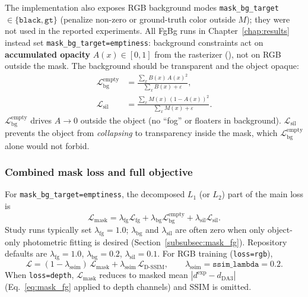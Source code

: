 The implementation also exposes RGB background modes \texttt{mask\_bg\_target}$\in\{\texttt{black},\texttt{gt}\}$ (penalize non-zero or ground-truth color outside $M$); they were not used in the reported experiments. All FgBg runs in Chapter~\ref{chap:results} instead set \texttt{mask\_bg\_target=emptiness}: background constraints act on \textbf{accumulated opacity} $A(x)\in[0,1]$ from the rasterizer (), not on RGB outside the mask. The background should be transparent and the object opaque:
\begin{align}
\mathcal{L}_{\mathrm{bg}}^{\mathrm{empty}}
&=\frac{\sum_{x} B(x)\,A(x)^2}{\sum_{x} B(x) + \varepsilon},
\label{eq:mask_bg_empty}\\
\mathcal{L}_{\mathrm{sil}}
&=\frac{\sum_{x} M(x)\,(1-A(x))^2}{\sum_{x} M(x) + \varepsilon}.
\label{eq:mask_sil}
\end{align}
$\mathcal{L}_{\mathrm{bg}}^{\mathrm{empty}}$ drives $A\to 0$ outside the object (no ``fog'' or floaters in background). $\mathcal{L}_{\mathrm{sil}}$ prevents the object from \emph{collapsing} to transparency inside the mask, which $\mathcal{L}_{\mathrm{bg}}^{\mathrm{empty}}$ alone would not forbid.

\subsubsection{Combined mask loss and full objective}
\label{subsubsec:mask_combined}

For \texttt{mask\_bg\_target=emptiness}, the decomposed $L_1$ (or $L_2$) part of the main loss is
\begin{equation}
\mathcal{L}_{\mathrm{mask}}
=\lambda_{\mathrm{fg}}\mathcal{L}_{\mathrm{fg}}
+\lambda_{\mathrm{bg}}\mathcal{L}_{\mathrm{bg}}^{\mathrm{empty}}
+\lambda_{\mathrm{sil}}\mathcal{L}_{\mathrm{sil}}.
\label{eq:mask_combined}
\end{equation}
Study runs typically set $\lambda_{\mathrm{fg}}=1.0$; $\lambda_{\mathrm{bg}}$ and $\lambda_{\mathrm{sil}}$ are often zero when only object-only photometric fitting is desired (Section~\ref{subsubsec:mask_fg}). Repository defaults are $\lambda_{\mathrm{fg}}=1.0$, $\lambda_{\mathrm{bg}}=0.2$, $\lambda_{\mathrm{sil}}=0.1$. For RGB training (\texttt{loss=rgb}),
\begin{equation}
\mathcal{L}
=(1-\lambda_{\mathrm{ssim}})\,\mathcal{L}_{\mathrm{mask}}
+\lambda_{\mathrm{ssim}}\,\mathcal{L}_{\mathrm{D\text{-}SSIM}},
\qquad \lambda_{\mathrm{ssim}}=\texttt{ssim\_lambda}=0.2.
\label{eq:mask_total_rgb}
\end{equation}
When \texttt{loss=depth}, $\mathcal{L}_{\mathrm{mask}}$ reduces to masked mean $|d^{\mathrm{exp}}-d_{\mathrm{DA3}}|$ (Eq.~\eqref{eq:mask_fg} applied to depth channels) and SSIM is omitted.

